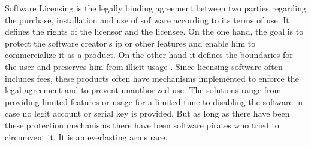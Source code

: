 Software Licensing is the legally binding agreement between two parties regarding the purchase, installation and use of software according to its terms of use.
It defines the rights of the licensor and the licensee.
On the one hand, the goal is to protect the software creator's \gls{ip} or other features and enable him to commercialize it as a product.
On the other hand it defines the boundaries for the user and preserves him from illicit usage \cite{uncgLicensing}.
\newline
\newline
Since licensing software often includes fees, these products often have mechanisms implemented to enforce the legal agreement and to prevent unauthorized use.
The solutions range from providing limited features or usage for a limited time to disabling the software in case no legit account or serial key is provided.
\newline
\newline
But as long as there have been these protection mechanisms there have been software pirates who tried to circumvent it. It is an everlasting arms race\cite{szCopy}.


%

%

%
%

%
%



